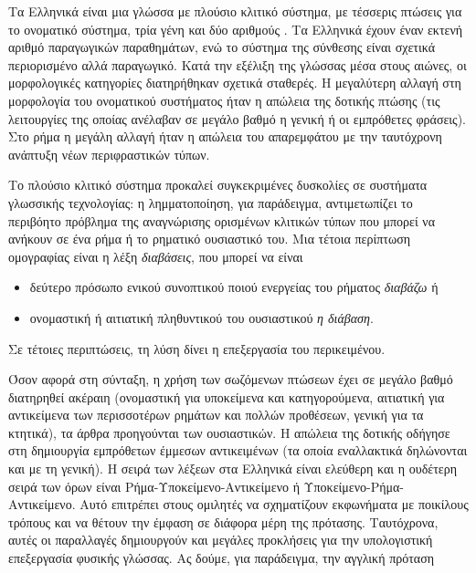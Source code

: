\documentclass[]{../../metanetpaper}
\begin{document}
\begin{multicols}{2}
Τα Ελληνικά είναι μια γλώσσα με πλούσιο κλιτικό σύστημα, με τέσσερις πτώσεις για το ονοματικό σύστημα, τρία γένη και δύο αριθμούς \cite{Mack1}. Τα Ελληνικά έχουν έναν εκτενή  αριθμό  παραγωγικών παραθημάτων, ενώ το σύστημα της σύνθεσης είναι σχετικά περιορισμένο αλλά παραγωγικό. Κατά την εξέλιξη της γλώσσας μέσα στους αιώνες, οι μορφολογικές κατηγορίες διατηρήθηκαν σχετικά σταθερές. Η μεγαλύτερη αλλαγή στη μορφολογία του ονοματικού συστήματος ήταν η απώλεια της δοτικής πτώσης (τις λειτουργίες της οποίας ανέλαβαν σε μεγάλο βαθμό η γενική ή οι εμπρόθετες φράσεις). Στο ρήμα η μεγάλη αλλαγή ήταν η απώλεια του απαρεμφάτου με την ταυτόχρονη ανάπτυξη νέων περιφραστικών τύπων.


Το πλούσιο κλιτικό σύστημα προκαλεί συγκεκριμένες δυσκολίες σε συστήματα γλωσσικής τεχνολογίας: η λημματοποίηση, για παράδειγμα, αντιμετωπίζει το περιβόητο πρόβλημα της αναγνώρισης ορισμένων κλιτικών τύπων που μπορεί να ανήκουν σε ένα ρήμα ή το ρηματικό ουσιαστικό του. Μια τέτοια περίπτωση ομογραφίας είναι η λέξη \textit{διαβάσεις}, που μπορεί να είναι

\begin{itemize}
\item δεύτερο πρόσωπο ενικού συνοπτικού ποιού ενεργείας του ρήματος \textit{διαβάζω} ή
\item ονομαστική ή αιτιατική πληθυντικού του ουσιαστικού \textit{η διάβαση}.
\end{itemize}

Σε τέτοιες περιπτώσεις, τη λύση δίνει η επεξεργασία του περικειμένου.

Όσον αφορά στη σύνταξη, η χρήση των σωζόμενων πτώσεων έχει σε μεγάλο βαθμό διατηρηθεί ακέραιη (ονομαστική για υποκείμενα και κατηγορούμενα, αιτιατική για αντικείμενα των περισσοτέρων ρημάτων και πολλών προθέσεων, γενική για τα κτητικά), τα άρθρα προηγούνται των ουσιαστικών. Η απώλεια της δοτικής οδήγησε στη δημιουργία εμπρόθετων έμμεσων αντικειμένων (τα οποία εναλλακτικά  δηλώνονται και με τη γενική). Η σειρά των λέξεων στα Ελληνικά είναι ελεύθερη και η ουδέτερη σειρά των όρων είναι Ρήμα-Υποκείμενο-Αντικείμενο ή Υποκείμενο-Ρήμα-Αντικείμενο. Αυτό επιτρέπει στους ομιλητές να σχηματίζουν εκφωνήματα με ποικίλους τρόπους και να θέτουν την έμφαση σε διάφορα μέρη της πρότασης. Ταυτόχρονα, αυτές οι παραλλαγές δημιουργούν και μεγάλες προκλήσεις για την υπολογιστική επεξεργασία φυσικής γλώσσας. Ας δούμε, για παράδειγμα, την αγγλική πρόταση


\end{multicols}
\end{document}
